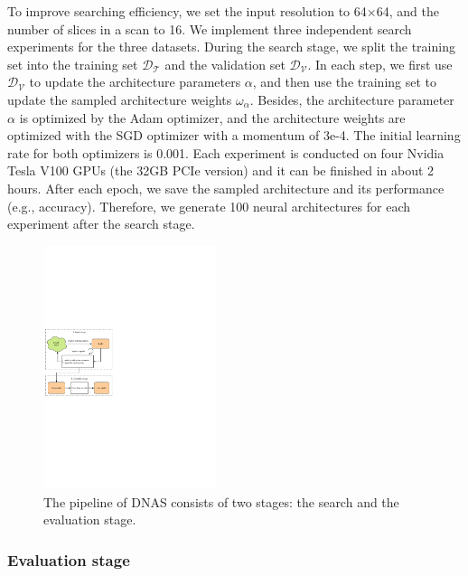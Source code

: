 \documentclass[letterpaper]{article}
\begin{document}
To improve searching efficiency, we set the input resolution to 64$\times$64, and the number of slices in a scan to 16. We implement three independent search experiments for the three datasets. During the search stage, we split the training set into the training set $\mathcal{D_T}$ and the validation set $\mathcal{D_V}$. In each step, we first use $\mathcal{D_V}$ to update the architecture parameters $\alpha$, and then use the training set to update the sampled architecture weights $\omega_\alpha$. Besides, the architecture parameter $\alpha$ is optimized by the Adam \cite{adam} optimizer, and the architecture weights are optimized with the SGD optimizer with a momentum of 3e-4. The initial learning rate for both optimizers is 0.001.  Each experiment is conducted on four Nvidia Tesla V100 GPUs (the 32GB PCIe version) and it can be finished in about 2 hours. After each epoch, we save the sampled architecture and its performance (e.g., accuracy). Therefore, we generate 100 neural architectures for each experiment after the search stage.


\begin{figure}[!ht]
    \centering
    \includegraphics[width=0.45\textwidth]{images/gdas.pdf}
    \caption{The pipeline of DNAS consists of two stages: the search and the evaluation stage.}
    \label{fig:gdas}
\end{figure}


\subsubsection{Evaluation stage}
\end{document}
